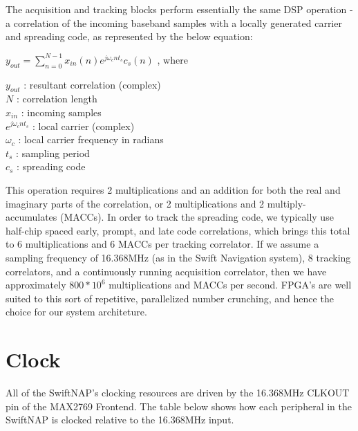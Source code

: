\documentclass{article}
\begin{document}
\begin{multicols}{2}
The acquisition and tracking blocks perform essentially the same DSP operation - a correlation of
the incoming baseband samples with a locally generated carrier and spreading code, as represented
by the below equation:
\normalfont\small
\begin{center}$y_{out}=\displaystyle\sum\limits_{n=0}^{N-1}x_{in}(n)e^{j\omega_{c} nt_s}c_{s}(n)$ ,
where
\end{center}
$y_{out}$ : resultant correlation (complex)\\
$N$ : correlation length \\
$x_{in}$ : incoming samples \\
$e^{j\omega_{c} nt_s}$ : local carrier (complex)\\
$\omega_{c}$ : local carrier frequency in radians \\
$t_{s}$ : sampling period \\
$c_s$ : spreading code \\

\normalfont\normalsize

This operation requires 2 multiplications and an addition for both the real and imaginary parts
of the correlation, or 2 multiplications and 2 multiply-accumulates (MACCs). In order to track the
spreading code, we typically use half-chip spaced early, prompt, and late code correlations, which
brings this total to 6 multiplications and 6 MACCs per tracking correlator. If we assume a sampling
frequency of 16.368MHz (as in the Swift Navigation system), 8 tracking correlators, and a continuously 
running acquisition correlator, then we have approximately $800*10^6$ multiplications and MACCs per 
second. FPGA's are well suited to this sort of repetitive, parallelized number crunching, and hence
the choice for our system architeture.

\pagebreak

\section{Clock}

All of the SwiftNAP's clocking resources are driven by the 16.368MHz CLKOUT pin of the MAX2769 Frontend.
The table below shows how each peripheral in the SwiftNAP is clocked relative to the 16.368MHz input.
\begin{center}
\end{center}
\end{multicols}
\end{document}
